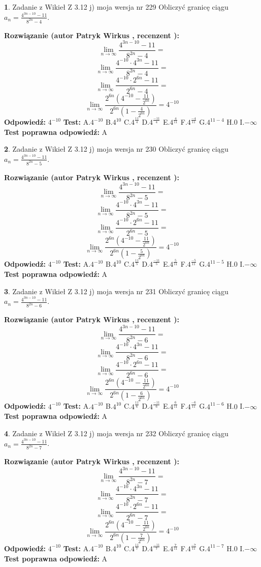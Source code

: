 \documentclass[12pt, a4paper]{article}
\theoremstyle{definition} %
\newtheorem{zad}{}
\newcommand{\zadStart}[1]{\begin{zad}#1\newline}
\newcommand{\zadStop}{\end{zad}}
\newcommand{\rozwStart}[2]{\noindent \textbf{Rozwiązanie (autor #1 , recenzent #2): }\newline}
\newcommand{\rozwStop}{\newline}
\newcommand{\odpStart}{\noindent \textbf{Odpowiedź:}\newline}
\newcommand{\odpStop}{\newline}
\newcommand{\testStart}{\noindent \textbf{Test:}\newline}
\newcommand{\testStop}{\newline}
\newcommand{\kluczStart}{\noindent \textbf{Test poprawna odpowiedź:}\newline}
\newcommand{\kluczStop}{\newline}
\begin{document}
\zadStart{Zadanie z Wikieł Z 3.12 j) moja wersja nr 229}
Obliczyć granicę ciągu $a_{n}=\frac{4^{3n-10}-11}{8^{2n}-4}$.
\zadStop
\rozwStart{Patryk Wirkus}{}
$$\lim\limits_{n\to\infty}\frac{4^{3n-10}-11}{8^{2n}-4}=$$
$$\lim\limits_{n\to\infty}\frac{4^{-10} \cdot 4^{3n}-11}{8^{2n}-4}=$$
$$\lim\limits_{n\to\infty}\frac{4^{-10} \cdot 2^{6n}-11}{2^{6n}-4}=$$
$$\lim\limits_{n\to\infty}\frac{2^{6n}(4^{-10} - \frac{11}{2^{6n}})}{2^{6n}(1-\frac{4}{2^{6n}})}= 4^{-10}$$
\rozwStop
\odpStart
$4^{-10}$
\odpStop
\testStart
A.$4^{-10}$
B.$4^{10}$
C.$4^{\frac{11}{4}}$
D.$4^{\frac{-11}{4}}$
E.$4^{\frac{4}{11}}$
F.$4^{\frac{-4}{11}}$
G.$4^{11-4}$
H.$0$
I.$-\infty$
\testStop
\kluczStart
A
\kluczStop



\zadStart{Zadanie z Wikieł Z 3.12 j) moja wersja nr 230}
Obliczyć granicę ciągu $a_{n}=\frac{4^{3n-10}-11}{8^{2n}-5}$.
\zadStop
\rozwStart{Patryk Wirkus}{}
$$\lim\limits_{n\to\infty}\frac{4^{3n-10}-11}{8^{2n}-5}=$$
$$\lim\limits_{n\to\infty}\frac{4^{-10} \cdot 4^{3n}-11}{8^{2n}-5}=$$
$$\lim\limits_{n\to\infty}\frac{4^{-10} \cdot 2^{6n}-11}{2^{6n}-5}=$$
$$\lim\limits_{n\to\infty}\frac{2^{6n}(4^{-10} - \frac{11}{2^{6n}})}{2^{6n}(1-\frac{5}{2^{6n}})}= 4^{-10}$$
\rozwStop
\odpStart
$4^{-10}$
\odpStop
\testStart
A.$4^{-10}$
B.$4^{10}$
C.$4^{\frac{11}{5}}$
D.$4^{\frac{-11}{5}}$
E.$4^{\frac{5}{11}}$
F.$4^{\frac{-5}{11}}$
G.$4^{11-5}$
H.$0$
I.$-\infty$
\testStop
\kluczStart
A
\kluczStop



\zadStart{Zadanie z Wikieł Z 3.12 j) moja wersja nr 231}
Obliczyć granicę ciągu $a_{n}=\frac{4^{3n-10}-11}{8^{2n}-6}$.
\zadStop
\rozwStart{Patryk Wirkus}{}
$$\lim\limits_{n\to\infty}\frac{4^{3n-10}-11}{8^{2n}-6}=$$
$$\lim\limits_{n\to\infty}\frac{4^{-10} \cdot 4^{3n}-11}{8^{2n}-6}=$$
$$\lim\limits_{n\to\infty}\frac{4^{-10} \cdot 2^{6n}-11}{2^{6n}-6}=$$
$$\lim\limits_{n\to\infty}\frac{2^{6n}(4^{-10} - \frac{11}{2^{6n}})}{2^{6n}(1-\frac{6}{2^{6n}})}= 4^{-10}$$
\rozwStop
\odpStart
$4^{-10}$
\odpStop
\testStart
A.$4^{-10}$
B.$4^{10}$
C.$4^{\frac{11}{6}}$
D.$4^{\frac{-11}{6}}$
E.$4^{\frac{6}{11}}$
F.$4^{\frac{-6}{11}}$
G.$4^{11-6}$
H.$0$
I.$-\infty$
\testStop
\kluczStart
A
\kluczStop



\zadStart{Zadanie z Wikieł Z 3.12 j) moja wersja nr 232}
Obliczyć granicę ciągu $a_{n}=\frac{4^{3n-10}-11}{8^{2n}-7}$.
\zadStop
\rozwStart{Patryk Wirkus}{}
$$\lim\limits_{n\to\infty}\frac{4^{3n-10}-11}{8^{2n}-7}=$$
$$\lim\limits_{n\to\infty}\frac{4^{-10} \cdot 4^{3n}-11}{8^{2n}-7}=$$
$$\lim\limits_{n\to\infty}\frac{4^{-10} \cdot 2^{6n}-11}{2^{6n}-7}=$$
$$\lim\limits_{n\to\infty}\frac{2^{6n}(4^{-10} - \frac{11}{2^{6n}})}{2^{6n}(1-\frac{7}{2^{6n}})}= 4^{-10}$$
\rozwStop
\odpStart
$4^{-10}$
\odpStop
\testStart
A.$4^{-10}$
B.$4^{10}$
C.$4^{\frac{11}{7}}$
D.$4^{\frac{-11}{7}}$
E.$4^{\frac{7}{11}}$
F.$4^{\frac{-7}{11}}$
G.$4^{11-7}$
H.$0$
I.$-\infty$
\testStop
\kluczStart
A
\kluczStop
\end{document}
